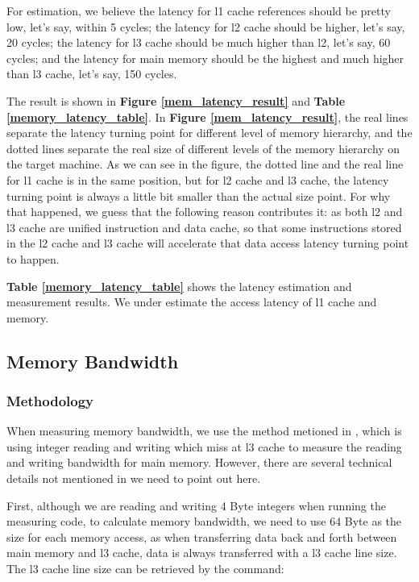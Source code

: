 For estimation, we believe the latency for l1 cache references should be pretty low, let's say, within 5 cycles; the latency for l2 cache should be higher, let's say, 20 cycles; the latency for l3 cache should be much higher than l2, let's say, 60 cycles; and the latency for main memory should be the highest and much higher than l3 cache, let's say, 150 cycles.

The result is shown in \textbf{Figure \ref{mem_latency_result}} and \textbf{Table \ref{memory_latency_table}}. In \textbf{Figure \ref{mem_latency_result}}, the real lines separate the latency turning point for different level of memory hierarchy, and the dotted lines separate the real size of different levels of the memory hierarchy on the target machine. As we can see in the figure, the dotted line and the real line for l1 cache is in the same position, but for l2 cache and l3 cache, the latency turning point is always a little bit smaller than the actual size point. For why that happened, we guess that the following reason contributes it: as both l2 and l3 cache are unified instruction and data cache, so that some instructions stored in the l2 cache and l3 cache will accelerate that data access latency turning point to happen.

\textbf{Table \ref{memory_latency_table}} shows the latency estimation and measurement results. We under estimate the access latency of l1 cache and memory.

\subsection{Memory Bandwidth}

\subsubsection{Methodology}

When measuring memory bandwidth, we use the method metioned in \cite{mcvoy1996lmbench}, which is using integer reading and writing which miss at l3 cache to measure the reading and writing bandwidth for main memory. However, there are several technical details not mentioned in \cite{mcvoy1996lmbench} we need to point out here.

First, although we are reading and writing 4 Byte integers when running the measuring code, to calculate memory bandwidth, we need to use 64 Byte as the size for each memory access, as when transferring data back and forth between main memory and l3 cache, data is always transferred with a l3 cache line size. The l3 cache line size can be retrieved by the command:

